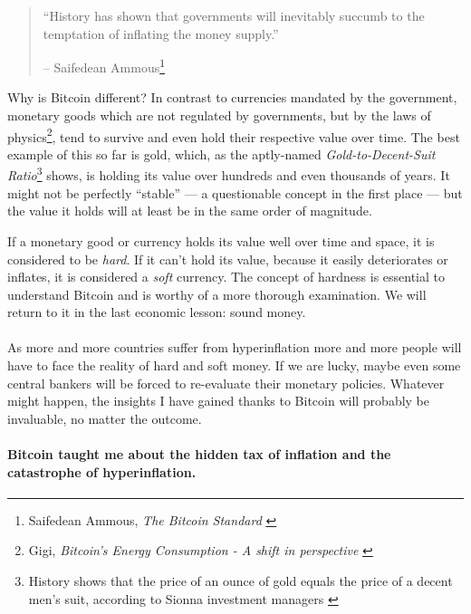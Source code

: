 \begin{quotation}\begin{samepage}
\enquote{History has shown that governments will inevitably succumb to the
temptation of inflating the money supply.}
\begin{flushright} -- Saifedean Ammous\footnote{Saifedean Ammous, 
    \textit{The Bitcoin
Standard} \cite{bitcoin-standard}}
\end{flushright}\end{samepage}\end{quotation}

\newpage

Why is Bitcoin different? In contrast to currencies mandated by the government,
monetary goods which are not regulated by governments, but by the laws of
physics\footnote{Gigi, \textit{Bitcoin's Energy Consumption - A shift in
perspective} \cite{gigi:energy}}, tend to survive and even hold their respective
value over time. The best example of this so far is gold, which, as the
aptly-named \textit{Gold-to-Decent-Suit Ratio}\footnote{History shows that the
price of an ounce of gold equals the price of a decent men's suit, according to 
Sionna investment managers \cite{web:gold-to-decent-suite-ratio}} shows, is 
holding its value over hundreds and even thousands of years. It might not be 
perfectly \enquote{stable} --- a questionable concept in the first place --- 
but the value it holds will at least be in the same order of magnitude.

If a monetary good or currency holds its value well over time and space,
it is considered to be \textit{hard}. If it can't hold its value, because it
easily deteriorates or inflates, it is considered a \textit{soft} currency. The
concept of hardness is essential to understand Bitcoin and is worthy of
a more thorough examination. We will return to it in the last economic
lesson: sound money.

\paragraph{}
As more and more countries suffer from
hyperinflation more and more people will have to face the reality
of hard and soft money. If we are lucky, maybe even some central bankers will be
forced to re-evaluate their monetary policies. Whatever might happen, the
insights I have gained thanks to Bitcoin will probably be invaluable, no matter
the outcome.

\paragraph{Bitcoin taught me about the hidden tax of inflation and the 
catastrophe of hyperinflation.}


